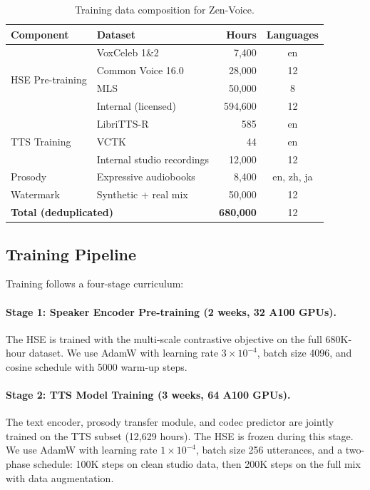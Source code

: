 \documentclass[11pt,a4paper]{article}
\begin{document}
\begin{table}[t]
\centering
\caption{Training data composition for Zen-Voice.}
\label{tab:data}
\begin{tabular}{llrc}
\toprule
\textbf{Component} & \textbf{Dataset} & \textbf{Hours} & \textbf{Languages} \\
\midrule
\multirow{4}{*}{HSE Pre-training} & VoxCeleb 1\&2 & 7,400 & en \\
& Common Voice 16.0 & 28,000 & 12 \\
& MLS & 50,000 & 8 \\
& Internal (licensed) & 594,600 & 12 \\
\midrule
\multirow{3}{*}{TTS Training} & LibriTTS-R & 585 & en \\
& VCTK & 44 & en \\
& Internal studio recordings & 12,000 & 12 \\
\midrule
Prosody & Expressive audiobooks & 8,400 & en, zh, ja \\
\midrule
Watermark & Synthetic + real mix & 50,000 & 12 \\
\midrule
\multicolumn{2}{l}{\textbf{Total (deduplicated)}} & \textbf{680,000} & 12 \\
\bottomrule
\end{tabular}
\end{table}

\subsection{Training Pipeline}

Training follows a four-stage curriculum:

\paragraph{Stage 1: Speaker Encoder Pre-training (2 weeks, 32 A100 GPUs).} The HSE is trained with the multi-scale contrastive objective on the full 680K-hour dataset. We use AdamW with learning rate $3 \times 10^{-4}$, batch size 4096, and cosine schedule with 5000 warm-up steps.

\paragraph{Stage 2: TTS Model Training (3 weeks, 64 A100 GPUs).} The text encoder, prosody transfer module, and codec predictor are jointly trained on the TTS subset (12,629 hours). The HSE is frozen during this stage. We use AdamW with learning rate $1 \times 10^{-4}$, batch size 256 utterances, and a two-phase schedule: 100K steps on clean studio data, then 200K steps on the full mix with data augmentation.
\end{document}
